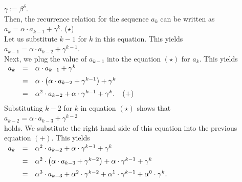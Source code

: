 $\gamma := \beta^{\delta}$.
\\[0.2cm]
Then, the recurrence relation for the sequence $a_k$ can be written as
\\[0.2cm]
\hspace*{1.3cm}
$a_k = \alpha \cdot a_{k-1} + \gamma^k$. \hspace*{\fill} ($\star$)
\\[0.2cm]
Let us substitute $k-1$ for $k$ in this equation.  This yields
\\[0.2cm]
\hspace*{1.3cm}
$a_{k-1} = \alpha \cdot a_{k-2} + \gamma^{k-1}$.
\\[0.2cm]
Next, we plug the value of $a_{k-1}$ into the equation $(\star)$ for $a_k$.  This yields
\\[0.2cm]
\hspace*{1.3cm}
$
\begin{array}[b]{lcl}
  a_k & = & \alpha \cdot a_{k-1} + \gamma^k  \\[0.2cm]
      & = & \alpha \cdot \bigl(\alpha \cdot a_{k-2} + \gamma^{k-1}\bigr) + \gamma^k \\[0.2cm]
      & = & \alpha^2 \cdot a_{k-2} + \alpha \cdot \gamma^{k-1} + \gamma^k. 
     \\[0.2cm]
\end{array}
$ \hspace*{\fill} ($+$)
\\[0.2cm]
Substituting $k-2$ for $k$ in equation $(\star)$ shows that
\\[0.2cm]
\hspace*{1.3cm}
$a_{k-2} = \alpha \cdot a_{k-3} + \gamma^{k-2}$
\\[0.2cm]
holds.  We substitute the right hand side of this equation into the previous equation $(+)$.  This yields
\\[0.2cm]
\hspace*{1.3cm}
$
\begin{array}[t]{lcl}
  a_k & = & \alpha^2 \cdot a_{k-2} + \alpha \cdot \gamma^{k-1} + \gamma^k
            \\[0.2cm]
      & = & \alpha^2 \cdot \bigl(\alpha \cdot a_{k-3} + \gamma^{k-2}\bigr) + \alpha \cdot \gamma^{k-1} + \gamma^k
            \\[0.2cm]
      & = & \alpha^3 \cdot a_{k-3} + \alpha^2 \cdot \gamma^{k-2} + \alpha^1 \cdot \gamma^{k-1} + \alpha^0 \cdot \gamma^k. 
            \\[0.2cm]
\end{array}
$
\\[0.2cm]
